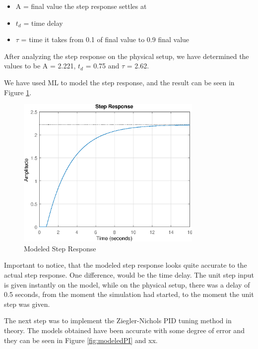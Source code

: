 \begin{itemize}
	\item A = final value the step response settles at
	\item $t_{d}$ = time delay
	\item $\tau$ = time it takes from 0.1 of final value to 0.9 final value
\end{itemize}

After analyzing the step response on the physical setup, we have determined the values to be A = 2.221, 
$t_d$ = 0.75 and $\tau$ = 2.62.

We have used ML to model the step response, and the result can be seen in Figure \ref{fig:modeledStepResponse}.

\begin{figure}[ht]
	\centering
	\includegraphics[width=0.8\textwidth]{figures/06ModelValidation/modeledStepResponse.eps}
	\caption{Modeled Step Response}
	\label{fig:modeledStepResponse}
\end{figure}

Important to notice, that the modeled step response looks quite accurate to the actual step response.
One difference, would be the time delay. The unit step input is given instantly on the model, while on the physical setup,
there was a delay of 0.5 seconds, from the moment the simulation had started, to the moment the unit step was given.

The next step was to implement the Ziegler-Nichols PID tuning method in theory. The models obtained have been accurate
with some degree of error and they can be seen in Figure \ref{fig:modeledPI} and xx.


